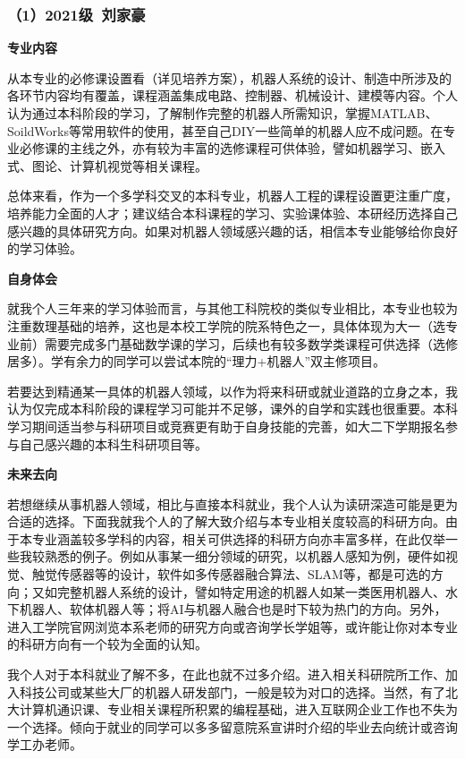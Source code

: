 \documentclass[11pt,oneside]{book}
\begin{document}
\subsubsection{（1）2021级\ 刘家豪}
\textbf{专业内容}

从本专业的必修课设置看（详见培养方案），机器人系统的设计、制造中所涉及的各环节内容均有覆盖，课程涵盖集成电路、控制器、机械设计、建模等内容。个人认为通过本科阶段的学习，了解制作完整的机器人所需知识，掌握MATLAB、SoildWorks等常用软件的使用，甚至自己DIY一些简单的机器人应不成问题。在专业必修课的主线之外，亦有较为丰富的选修课程可供体验，譬如机器学习、嵌入式、图论、计算机视觉等相关课程。

总体来看，作为一个多学科交叉的本科专业，机器人工程的课程设置更注重广度，培养能力全面的人才；建议结合本科课程的学习、实验课体验、本研经历选择自己感兴趣的具体研究方向。如果对机器人领域感兴趣的话，相信本专业能够给你良好的学习体验。

\textbf{自身体会}

就我个人三年来的学习体验而言，与其他工科院校的类似专业相比，本专业也较为注重数理基础的培养，这也是本校工学院的院系特色之一，具体体现为大一（选专业前）需要完成多门基础数学课的学习，后续也有较多数学类课程可供选择（选修居多）。学有余力的同学可以尝试本院的“理力+机器人”双主修项目。

若要达到精通某一具体的机器人领域，以作为将来科研或就业道路的立身之本，我认为仅完成本科阶段的课程学习可能并不足够，课外的自学和实践也很重要。本科学习期间适当参与科研项目或竞赛更有助于自身技能的完善，如大二下学期报名参与自己感兴趣的本科生科研项目等。

\textbf{未来去向}

若想继续从事机器人领域，相比与直接本科就业，我个人认为读研深造可能是更为合适的选择。下面我就我个人的了解大致介绍与本专业相关度较高的科研方向。由于本专业涵盖较多学科的内容，相关可供选择的科研方向亦丰富多样，在此仅举一些我较熟悉的例子。例如从事某一细分领域的研究，以机器人感知为例，硬件如视觉、触觉传感器等的设计，软件如多传感器融合算法、SLAM等，都是可选的方向；又如完整机器人系统的设计，譬如特定用途的机器人如某一类医用机器人、水下机器人、软体机器人等；将AI与机器人融合也是时下较为热门的方向。另外，进入工学院官网浏览本系老师的研究方向或咨询学长学姐等，或许能让你对本专业的科研方向有一个较为全面的认知。

我个人对于本科就业了解不多，在此也就不过多介绍。进入相关科研院所工作、加入科技公司或某些大厂的机器人研发部门，一般是较为对口的选择。当然，有了北大计算机通识课、专业相关课程所积累的编程基础，进入互联网企业工作也不失为一个选择。倾向于就业的同学可以多多留意院系宣讲时介绍的毕业去向统计或咨询学工办老师。
\end{document}
